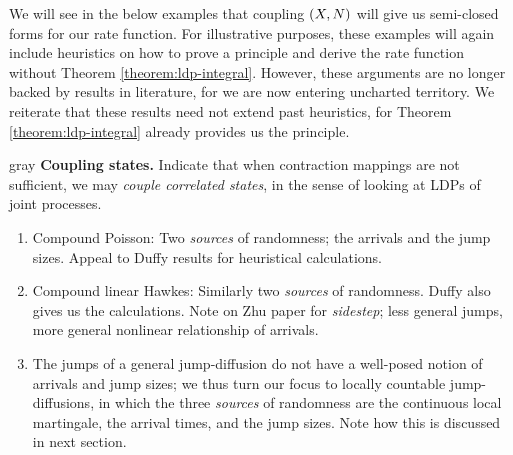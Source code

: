 We will see in the below examples that coupling $(X, N)$ will give us semi-closed forms for our rate function.
For illustrative purposes, these examples will again include heuristics on how to prove a principle and derive the rate function without Theorem \ref{theorem:ldp-integral}.
However, these arguments are no longer backed by results in literature, for we are now entering uncharted territory.
We reiterate that these results need not extend past heuristics, for Theorem \ref{theorem:ldp-integral} already provides us the principle.






\begin{color}{gray}
  {\bfseries Coupling states.}
  Indicate that when contraction mappings are not sufficient, we may \emph{couple correlated states}, in the sense of looking at LDPs of joint processes.
  \begin{enumerate}
    \item
      Compound Poisson: Two \emph{sources} of randomness; the arrivals and the jump sizes. Appeal to Duffy results for heuristical calculations.
    \item
      Compound linear Hawkes: Similarly two \emph{sources} of randomness. Duffy also gives us the calculations.
      Note on Zhu paper for \emph{sidestep}; less general jumps, more general nonlinear relationship of arrivals.
    \item
      The jumps of a general jump-diffusion do not have a well-posed notion of arrivals and jump sizes; we thus turn our focus to locally countable jump-diffusions, in which the three \emph{sources} of randomness are the continuous local martingale, the arrival times, and the jump sizes.
      Note how this is discussed in next section.
  \end{enumerate}
\end{color}
